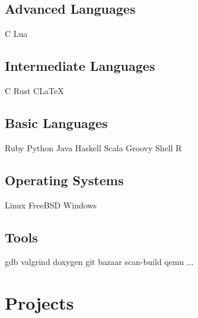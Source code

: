\documentclass[8pt]{article}
\newcommand\csharp{C\scalerel*{\#}{X}}
\def\cpp{{C\nolinebreak[4]\hspace{-.05em}\raisebox{.4ex}{\tiny\bf ++\xspace}}}
\newcommand\bt{\large\xspace{\bf\textperiodcentered}\xspace}
\begin{document}
\begin{minipage}[t]{0.35\textwidth}

\centering

\subsection*{Advanced Languages}
\cpp \bt Lua

\subsection*{Intermediate Languages}
C \bt Rust \bt \csharp \bt \LaTeX

\subsection*{Basic Languages}
Ruby \bt Python \bt Java \bt Haskell
Scala \bt Groovy \bt Shell \bt R

\subsection*{Operating Systems}
Linux \bt FreeBSD \bt Windows

\subsection*{Tools}
gdb \bt valgrind \bt doxygen \bt git
bazaar \bt scan-build \bt qemu ...

\end{minipage}

\centering
\section*{Projects}
\end{document}
